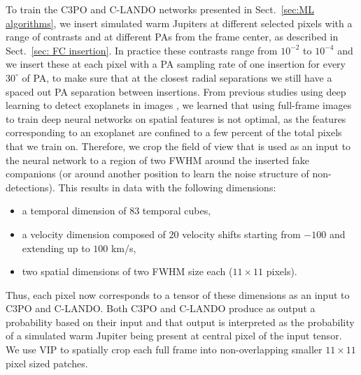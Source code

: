 \documentclass{aa}
\begin{document}
To train the C3PO and C-LANDO networks presented in Sect.~\ref{sec:ML algorithms}, we insert simulated warm Jupiters at different selected pixels with a range of contrasts and at different PAs from the frame center, as described in Sect.~\ref{sec: FC insertion}.
In practice these contrasts range from $10^{-2}$ to $10^{-4}$ and we insert these at each pixel with a PA sampling rate of one insertion for every $30^{\circ}$ of PA, to make sure that at the closest radial separations we still have a spaced out PA separation between insertions. From previous studies using deep learning to detect exoplanets in images \citep[e.g.,][]{2018Gomez,2023Carlito}, we learned that using full-frame images to train deep neural networks on spatial features is not optimal, as the features corresponding to an exoplanet are confined to a few percent of the total pixels that we train on. Therefore, we crop the field of view that is used as an input to the neural network to a region of two FWHM around the inserted fake companions (or around another position to learn the noise structure of non-detections).
This results in data with the following dimensions:
\begin{itemize}
    \item a temporal dimension of $83$ temporal cubes, 
    \item a velocity dimension composed of $20$ velocity shifts starting from $-100$ and extending up to $100$ km/s, 
    \item two spatial dimensions of two FWHM size each ($11\times 11$ pixels).
\end{itemize}
Thus, each pixel now corresponds to a tensor of these dimensions as an input to C3PO and C-LANDO.
Both C3PO and C-LANDO produce as output a probability based on their input and that output is interpreted as the probability of a simulated warm Jupiter being present at central pixel of the input tensor.
We use VIP to spatially crop each full frame into non-overlapping smaller $11\times11$ pixel sized patches.
\end{document}
